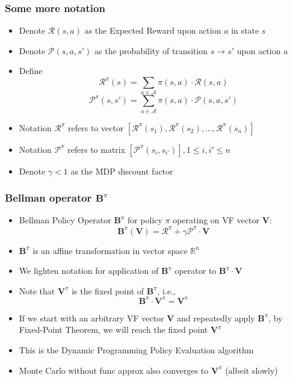 \documentclass[handout]{beamer}
\newcommand{\vpi}{\bm{V}^{\pi}}
\newcommand{\bb}{\bm{B}^{\pi}}
\newcommand{\bv}{\bm{V}}
\newcommand{\brew}{\bm{\mathcal{R}}^{\pi}}
\newcommand{\bprob}{\bm{\mathcal{P}}^{\pi}}
\begin{document}
\begin{frame}
\frametitle{Some more notation}
\pause
\begin{itemize}[<+->]
\item Denote $\mathcal{R}(s,a)$ as the Expected Reward upon action $a$ in state $s$
\item Denote $\mathcal{P}(s,a,s')$ as the probability of transition $s \rightarrow s'$ upon action $a$
\item Define
$$\brew(s) = \sum_{a \in \mathcal{A}} \pi(s, a) \cdot \mathcal{R}(s,a)$$
$$\bprob(s,s') = \sum_{a \in \mathcal{A}} \pi(s, a) \cdot \mathcal{P}(s,a,s')$$
\item Notation $\brew$ refers to vector $[\brew(s_1), \brew(s_2), \ldots, \brew(s_n)]$
\item Notation $\bprob$ refers to matrix $[\bprob(s_i, s_{i'})], 1 \leq i, i' \leq n$ 
\item Denote $\gamma < 1$ as the MDP discount factor
\end{itemize}
\end{frame}

\begin{frame}
\frametitle{Bellman operator $\bb$}
\pause
\begin{itemize}[<+->]
\item Bellman Policy Operator $\bb$ for policy $\pi$ operating on VF vector $\bv$:
$$\bb (\bv) = \bm{\mathcal{R}}^{\pi} + \gamma \bm{\mathcal{P}}^{\pi} \cdot \bv$$
\item $\bb$ is an affine transformation in vector space $\mathbb{R}^n$
\item We lighten notation for application of $\bb$ operator to $\bb \cdot \bv$
\item Note that $\vpi$ is the fixed point of $\bb$, i.e.,
$$\bb \cdot \vpi = \vpi$$
\item If we start with an arbitrary VF vector $\bv$ and repeatedly apply $\bb$, 
by Fixed-Point Theorem, we will reach the fixed point $\vpi$
\item This is the Dynamic Programming Policy Evaluation algorithm
\item Monte Carlo without func approx also converges to $\vpi$ (albeit slowly)
\end{itemize}
\end{frame}
\end{document}
